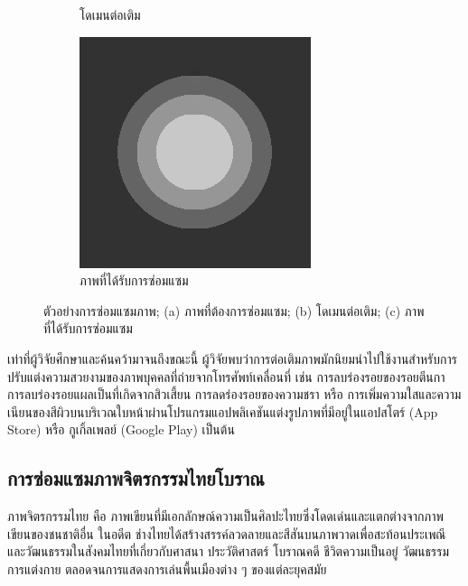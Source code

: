 \documentclass[hidelinks, a4paper,12pt]{article}
\numberwithin{equation}{section}							%
\numberwithin{equation}{section}
\begin{document}
{\begin{figure}[H]
\begin{subfigure}{0.3\linewidth}
			\caption{โดเมนต่อเติม}
		\end{subfigure}
		\begin{subfigure}{0.3\linewidth}
			\centering
			\includegraphics[width=0.8\linewidth]{images/grayscale_inpaint/result_splitbergman.png}
			\caption{ภาพที่ได้รับการซ่อมแซม}
		\end{subfigure}
		\caption{ตัวอย่างการซ่อมแซมภาพ; (a) ภาพที่ต้องการซ่อมแซม; (b) โดเมนต่อเติม; (c) ภาพที่ได้รับการซ่อมแซม}
		\label{fig1}
	\end{figure}
	
	\hspace{1cm} เท่าที่ผู้วิจัยศึกษาและค้นคว้ามาจนถึงขณะนี้ ผู้วิจัยพบว่าการต่อเติมภาพมักนิยมนำไปใช้งานสำหรับการปรับแต่งความสวยงามของภาพบุคคลที่ถ่ายจากโทรศัพท์เคลื่อนที่ เช่น การลบร่องรอยของรอยตีนกา การลบร่องรอยแผลเป็นที่เกิดจากสิวเสี้ยน การลดร่องรอยของความชรา หรือ การเพิ่มความใสและความเนียนของสีผิวบนบริเวณใบหน้าผ่านโปรแกรมแอปพลิเคชันแต่งรูปภาพที่มีอยู่ในแอปสโตร์ (App Store) หรือ กูเกิ้ลเพลย์ (Google Play) เป็นต้น 
	
	\subsection{การซ่อมแซมภาพจิตรกรรมไทยโบราณ}
	
	\hspace{1cm} ภาพจิตรกรรมไทย คือ ภาพเขียนที่มีเอกลักษณ์ความเป็นศิลปะไทยซึ่งโดดเด่นและแตกต่างจากภาพเขียนของชนชาติอื่น ในอดีต  ช่างไทยได้สร้างสรรค์ลวดลายและสีสันบนภาพวาดเพื่อสะท้อนประเพณีและวัฒนธรรมในสังคมไทยที่เกี่ยวกับศาสนา ประวัติศาสตร์ โบราณคดี ชีวิตความเป็นอยู่ วัฒนธรรมการแต่งกาย ตลอดจนการแสดงการเล่นพื้นเมืองต่าง ๆ ของแต่ละยุคสมัย 
	
}
\end{document}
